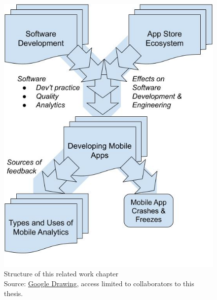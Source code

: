 \begin{figure}
    \centering
    \includegraphics[width=\textwidth]{images/my/related-work-chapter-structure-27-jul-2022b.jpeg}
    \caption{Structure of this related work chapter\\ Source: \href{https://docs.google.com/drawings/d/1DosM__BfTGqoIYkkkltbyDreCT5wYC1Z0mR9i1ZSxWc/edit?usp=sharing}{Google Drawing}, access limited to collaborators to this thesis.}
    \label{fig:related-work-chapter-structure}
\end{figure}




